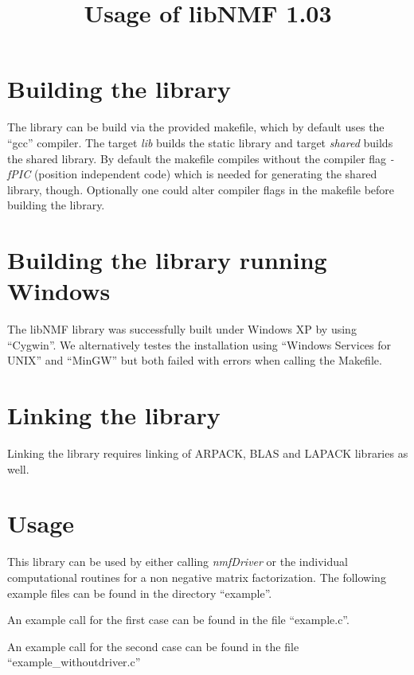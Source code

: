 \documentclass[a4paper,10pt]{scrartcl}
\title{Usage of libNMF 1.03}
\begin{document}
\fancyhead{}


\maketitle


	\section{Building the library}

	The library can be build via the provided makefile, which by default uses the ``gcc'' compiler.\newline\newline
	The target \emph{lib} builds the static library and target \emph{shared} builds the shared library.
	By default the makefile compiles without the compiler flag \emph{-fPIC} (position independent code) which is
	needed for generating the shared library, though.\newline\newline
	Optionally one could alter compiler flags in the makefile before building the library.

	\section{Building the library running Windows}

	The libNMF library was successfully built under Windows XP by using ``Cygwin''. We alternatively testes the installation using ``Windows Services for UNIX'' and ``MinGW'' but both failed with errors when calling the Makefile. 

	\section{Linking the library}

	Linking the library requires linking of ARPACK, BLAS and LAPACK libraries as well.

	\section{Usage}

	This library can be used by either calling \emph{nmfDriver} or the individual computational routines for
	a non negative matrix factorization. The following example files can be found in the directory ``example''.\newline

	An example call for the first case can be found in the file ``example.c''.\newline

	An example call for the second case can be found in the file ``example\_withoutdriver.c''\newline

	

	
\end{document}
